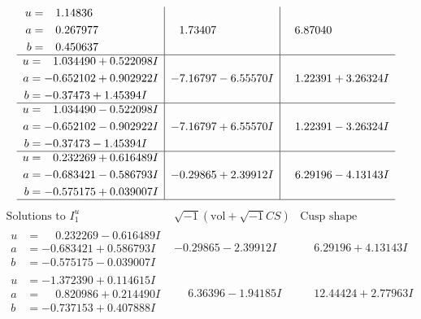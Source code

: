 \documentclass[1p]{elsarticle_modified}
\theoremstyle{definition}
\newcommand{\I}{\sqrt{-1}}
\begin{document}
$$\begin{array}{c|c|c}
\begin{aligned}
u &= \phantom{-}1.14836\phantom{ +0.000000I} \\
a &= \phantom{-}0.267977\phantom{ +0.000000I} \\
b &= \phantom{-}0.450637\phantom{ +0.000000I}\end{aligned}
 & \phantom{-}1.73407\phantom{ +0.000000I} & \phantom{-}6.87040\phantom{ +0.000000I} \\ \hline\begin{aligned}
u &= \phantom{-}1.034490 + 0.522098 I \\
a &= -0.652102 + 0.902922 I \\
b &= -0.37473 + 1.45394 I\end{aligned}
 & -7.16797 - 6.55570 I & \phantom{-}1.22391 + 3.26324 I \\ \hline\begin{aligned}
u &= \phantom{-}1.034490 - 0.522098 I \\
a &= -0.652102 - 0.902922 I \\
b &= -0.37473 - 1.45394 I\end{aligned}
 & -7.16797 + 6.55570 I & \phantom{-}1.22391 - 3.26324 I \\ \hline\begin{aligned}
u &= \phantom{-}0.232269 + 0.616489 I \\
a &= -0.683421 - 0.586793 I \\
b &= -0.575175 + 0.039007 I\end{aligned}
 & -0.29865 + 2.39912 I & \phantom{-}6.29196 - 4.13143 I\\
 \hline 
 \end{array}$$\newpage$$\begin{array}{c|c|c}  
\text{Solutions to }I^u_{1}& \I (\text{vol} + \sqrt{-1}CS) & \text{Cusp shape}\\
 \hline 
\begin{aligned}
u &= \phantom{-}0.232269 - 0.616489 I \\
a &= -0.683421 + 0.586793 I \\
b &= -0.575175 - 0.039007 I\end{aligned}
 & -0.29865 - 2.39912 I & \phantom{-}6.29196 + 4.13143 I \\ \hline\begin{aligned}
u &= -1.372390 + 0.114615 I \\
a &= \phantom{-}0.820986 + 0.214490 I \\
b &= -0.737153 + 0.407888 I\end{aligned}
 & \phantom{-}6.36396 - 1.94185 I & \phantom{-}12.44424 + 2.77963 I \\ \hline\begin{aligned}

\end{aligned}
\end{array}$$
\end{document}
